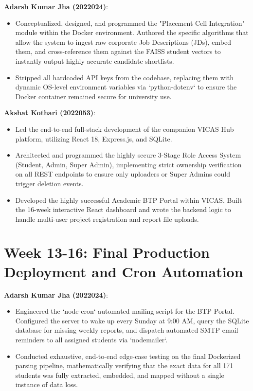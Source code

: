 \documentclass[12pt,a4paper]{report}
\begin{document}
\textbf{Adarsh Kumar Jha (2022024)}:
\begin{itemize}
    \item Conceptualized, designed, and programmed the "Placement Cell Integration" module within the Docker environment. Authored the specific algorithms that allow the system to ingest raw corporate Job Descriptions (JDs), embed them, and cross-reference them against the FAISS student vectors to instantly output highly accurate candidate shortlists.
    \item Stripped all hardcoded API keys from the codebase, replacing them with dynamic OS-level environment variables via `python-dotenv` to ensure the Docker container remained secure for university use.
\end{itemize}

\textbf{Akshat Kothari (2022053)}:
\begin{itemize}
    \item Led the end-to-end full-stack development of the companion VICAS Hub platform, utilizing React 18, Express.js, and SQLite.
    \item Architected and programmed the highly secure 3-Stage Role Access System (Student, Admin, Super Admin), implementing strict ownership verification on all REST endpoints to ensure only uploaders or Super Admins could trigger deletion events.
    \item Developed the highly successful Academic BTP Portal within VICAS. Built the 16-week interactive React dashboard and wrote the backend logic to handle multi-user project registration and report file uploads.
\end{itemize}

\section{Week 13-16: Final Production Deployment and Cron Automation}

\textbf{Adarsh Kumar Jha (2022024)}:
\begin{itemize}
    \item Engineered the `node-cron` automated mailing script for the BTP Portal. Configured the server to wake up every Sunday at 9:00 AM, query the SQLite database for missing weekly reports, and dispatch automated SMTP email reminders to all assigned students via `nodemailer`.
    \item Conducted exhaustive, end-to-end edge-case testing on the final Dockerized parsing pipeline, mathematically verifying that the exact data for all 171 students was fully extracted, embedded, and mapped without a single instance of data loss.
\end{itemize}
\end{document}

